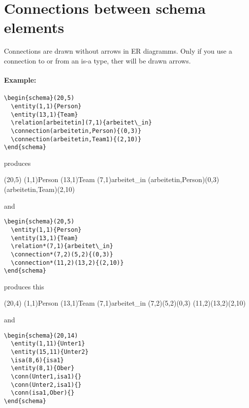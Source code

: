 \documentclass[a4paper,11pt]{article}
\begin{document}
\section{Connections between schema elements}

Connections are drawn without arrows in ER diagramms. Only if you use a 
connection to or from an is-a type, ther will be drawn arrows.

\paragraph{Example:}

\begin{verbatim}
\begin{schema}(20,5)
  \entity(1,1){Person}
  \entity(13,1){Team}
  \relation[arbeitetin](7,1){arbeitet\_in}
  \connection(arbeitetin,Person){(0,3)}
  \connection(arbeitetin,Team1){(2,10)}
\end{schema}
\end{verbatim}

produces

\begin{schema}(20,5)
  \entity(1,1){Person}
  \entity(13,1){Team}
  \relation[arbeitetin](7,1){arbeitet\_in}
  \connection(arbeitetin,Person){(0,3)}
  \connection(arbeitetin,Team){(2,10)}
\end{schema}

and 

\begin{verbatim}
\begin{schema}(20,5)
  \entity(1,1){Person}
  \entity(13,1){Team}
  \relation*(7,1){arbeitet\_in}
  \connection*(7,2)(5,2){(0,3)}
  \connection*(11,2)(13,2){(2,10)}
\end{schema}
\end{verbatim}

produces this

\begin{schema}(20,4)
  \entity(1,1){Person}
  \entity(13,1){Team}
  \relation*(7,1){arbeitet\_in}
  \connection*(7,2)(5,2){(0,3)}
  \connection*(11,2)(13,2){(2,10)}
\end{schema}

and

\begin{verbatim}
\begin{schema}(20,14)
  \entity(1,11){Unter1}
  \entity(15,11){Unter2}
  \isa(8,6){isa1}
  \entity(8,1){Ober}
  \conn(Unter1,isa1){}
  \conn(Unter2,isa1){}
  \conn(isa1,Ober){}
\end{schema}
\end{verbatim}
\end{document}
